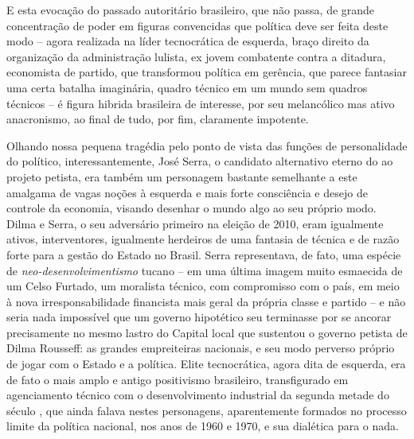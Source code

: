 E esta evocação do passado autoritário brasileiro, que não passa, de
grande concentração de poder em figuras convencidas que política deve
ser feita deste modo -- agora realizada na líder tecnocrática de
esquerda, braço direito da organização da administração lulista, ex
jovem combatente contra a ditadura, economista de partido, que
transformou política em gerência, que parece fantasiar uma certa batalha
imaginária, quadro técnico em um mundo sem quadros técnicos -- é figura
hibrida brasileira de interesse, por seu melancólico mas ativo
anacronismo, ao final de tudo, por fim, claramente impotente.

Olhando nossa pequena tragédia pelo ponto de vista das funções de
personalidade do político, interessantemente, José Serra, o candidato
alternativo eterno do  ao projeto petista, era também um personagem
bastante semelhante a este amalgama de vagas noções à esquerda e mais
forte consciência e desejo de controle da economia, visando desenhar o
mundo algo ao seu próprio modo. Dilma e Serra, o seu adversário primeiro
na eleição de 2010, eram igualmente ativos, interventores, igualmente
herdeiros de uma fantasia de técnica e de razão forte para a gestão do
Estado no Brasil. Serra representava, de fato, uma espécie de
\emph{neo-desenvolvimentismo} tucano -- em uma última imagem muito
esmaecida de um Celso Furtado, um moralista técnico, com compromisso com
o país, em meio à nova irresponsabilidade financista mais geral da
própria classe e partido -- e não seria nada impossível que um governo
hipotético seu terminasse por se ancorar precisamente no mesmo lastro do
Capital local que sustentou o governo petista de Dilma Rousseff: as
grandes empreiteiras nacionais, e seu modo perverso próprio de jogar com
o Estado e a política. Elite tecnocrática, agora dita de esquerda, era
de fato o mais amplo e antigo positivismo brasileiro, transfigurado em
agenciamento técnico com o desenvolvimento industrial da segunda metade
do século , que ainda falava nestes personagens, aparentemente
formados no processo limite da política nacional, nos anos de 1960 e
1970, e sua dialética para o nada.

